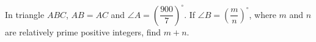 In triangle $ABC$, $AB=AC$ and $\angle A=\left(\dfrac{900}{7}\right)^\circ$. If $\angle B=\left(\dfrac mn\right)^\circ$, where $m$ and $n$ are relatively prime positive integers, find $m+n$.
